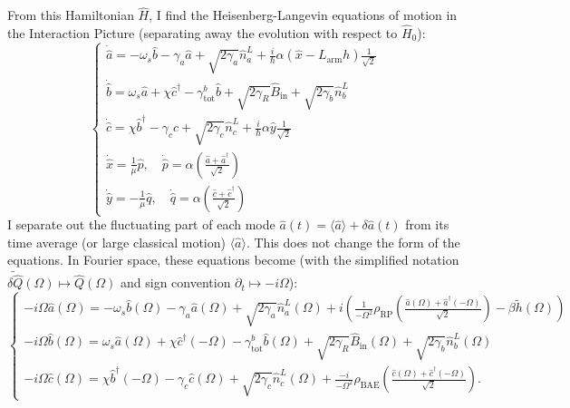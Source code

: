 From this Hamiltonian $\hat{H}$, I find the Heisenberg-Langevin equations of motion in the Interaction Picture (separating away the evolution with respect to $\hat{H}_0$):
$$\begin{cases}
\dot{\hat{a}}=-\omega_s\hat{b} - \gamma_a \hat{a} + \sqrt{2\gamma_a}\hat{n}^L_a+\frac{i}{\hbar}\alpha(\hat{x}-L_\mathrm{arm}h)\frac{1}{\sqrt{2}}\\
\dot{\hat{b}}=\omega_s\hat{a} + \chi\hat{c}^\dagger - \gamma^b_\mathrm{tot} \hat{b} + \sqrt{2\gamma_R}\hat{B}_\mathrm{in} + \sqrt{2\gamma_b}\hat{n}^L_b\\
\dot{\hat{c}}=\chi\hat{b}^\dagger - \gamma_c \hat{c} + \sqrt{2\gamma_c}\hat{n}^L_c + \frac{i}{\hbar}\alpha \hat{y}\frac{1}{\sqrt{2}}\\
\dot{\hat{x}}=\frac{1}{\mu}\hat{p},\quad \dot{\hat{p}}=\alpha(\frac{\hat{a}+\hat{a}^\dag}{\sqrt{2}})\\
\dot{\hat{y}}=-\frac{1}{\mu}\hat{q},\quad \dot{\hat{q}}=\alpha(\frac{\hat{c}+\hat{c}^\dag}{\sqrt{2}})
\end{cases}$$
I separate out the fluctuating part of each mode $\hat{a}(t)=\langle\hat{a}\rangle+\delta\hat{a}(t)$ from its time average (or large classical motion) $\langle\hat{a}\rangle$. This does not change the form of the equations.  
In Fourier space, these equations become (with the simplified notation $\tilde{\delta\hat{Q}}(\Omega)\mapsto\hat{Q}(\Omega)$ and sign convention $\partial_t\mapsto-i\Omega$):
\begin{equation}
\begin{cases}
\label{eq:nIS-2}
-i\Omega\hat{a}(\Omega)=-\omega_s\hat{b}(\Omega) - \gamma_a \hat{a}(\Omega) + \sqrt{2\gamma_a}\hat{n}^L_a(\Omega)+i(\frac{1}{-\Omega^2}\rho_\mathrm{RP}(\frac{\hat{a}(\Omega)+\hat{a}^\dag(-\Omega)}{\sqrt{2}})-\beta\tilde{h}(\Omega))\\
-i\Omega\hat{b}(\Omega)=\omega_s\hat{a}(\Omega) + \chi\hat{c}^\dagger(-\Omega) - \gamma^b_\mathrm{tot} \hat{b}(\Omega) + \sqrt{2\gamma_R}\hat{B}_\mathrm{in}(\Omega) + \sqrt{2\gamma_b}\hat{n}^L_b(\Omega)\\
-i\Omega\hat{c}(\Omega)=\chi\hat{b}^\dagger(-\Omega) - \gamma_c \hat{c}(\Omega) + \sqrt{2\gamma_c}\hat{n}^L_c(\Omega) + \frac{-i}{-\Omega^2}\rho_\mathrm{BAE}(\frac{\hat{c}(\Omega)+\hat{c}^\dag(-\Omega)}{\sqrt{2}}).
\end{cases}
\end{equation}

